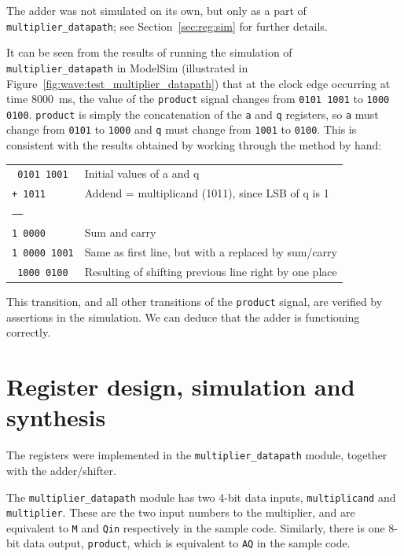 \documentclass[a4paper]{article}
\begin{document}
The adder was not simulated on its own, but only as a part of \texttt{multiplier\_datapath}; see Section~\ref{sec:reg:sim} for further details.

It can be seen from the results of running the simulation of \texttt{multiplier\_datapath} in ModelSim (illustrated in Figure~\ref{fig:wave:test_multiplier_datapath}) that at the clock edge occurring at time \SI{8000}{\milli\second}, the value of the \texttt{product} signal changes from \texttt{0101 1001} to \texttt{1000 0100}. \texttt{product} is simply the concatenation of the \texttt{a} and \texttt{q} registers, so \texttt{a} must change from \texttt{0101} to \texttt{1000} and \texttt{q} must change from \texttt{1001} to \texttt{0100}. This is consistent with the results obtained by working through the method by hand:

\vspace{10pt}
\begin{tabular}{ll}
\texttt{  0101 1001} & Initial values of a and q \\
\texttt{+ 1011     } & Addend = multiplicand (1011), since LSB of q is 1 \\
\texttt{------     } & \\
\texttt{1 0000     } & Sum and carry \\
\texttt{1 0000 1001} & Same as first line, but with a replaced by sum/carry \\
\texttt{  1000 0100} & Resulting of shifting previous line right by one place \\
\end{tabular}
\vspace{10pt}

This transition, and all other transitions of the \texttt{product} signal, are verified by assertions in the simulation. We can deduce that the adder is functioning correctly.

\section{Register design, simulation and synthesis}
\label{seg:reg}

The registers were implemented in the \texttt{multiplier\_datapath} module, together with the adder/shifter.

The \texttt{multiplier\_datapath} module has two 4-bit data inputs, \texttt{multiplicand} and \texttt{multiplier}. These are the two input numbers to the multiplier, and are equivalent to \texttt{M} and \texttt{Qin} respectively in the sample code. Similarly, there is one 8-bit data output, \texttt{product}, which is equivalent to \texttt{AQ} in the sample code.
\end{document}
